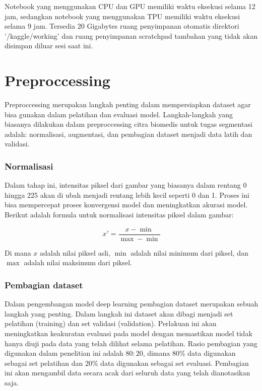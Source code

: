 \noindent Notebook yang menggunakan CPU dan GPU memiliki waktu eksekusi selama 12 jam, sedangkan notebook yang menggunakan TPU memiliki waktu eksekusi selama 9 jam. Tersedia 20 Gigabytes ruang penyimpanan otomatis direktori '/kaggle/working' dan ruang penyimpanan scratchpad tambahan yang tidak akan disimpan diluar sesi saat ini.


\section{Preproccessing}

\noindent Preproccessing merupakan langkah penting dalam mempersiapkan dataset agar bisa gunakan dalam pelatihan dan evaluasi model. Langkah-langkah yang biasanya dilakukan dalam preproccessing citra biomedis untuk tugas segmentasi adalah: normalisasi, augmentasi, dan pembagian dataset menjadi data latih dan validasi.

\subsubsection{Normalisasi}

\noindent Dalam tahap ini, intensitas piksel dari gambar yang biasanya dalam rentang 0 hingga 225 akan di ubah menjadi rentang lebih kecil seperti 0 dan 1. Proses ini bisa mempercepat proses konvergensi model dan meningkatkan akurasi model. Berikut adalah formula untuk normalisasi intensitas piksel dalam gambar:

\begin{equation}
	x' = \frac{x - \min}{\max - \min}
\end{equation}

Di mana \( x \) adalah nilai piksel asli, \( \min \) adalah nilai minimum dari piksel, dan \(\max\) adalah nilai maksimum dari piksel.


\subsubsection{Pembagian dataset}

\noindent Dalam pengembangan model deep learning pembagian dataset merupakan sebuah langkah yang penting. Dalam langkah ini dataset akan dibagi menjadi set pelatihan (training) dan set validasi (validation). Perlakuan ini akan meningkatkan keakuratan evaluasi pada model dengan memastikan model tidak hanya diuji pada data yang telah dilihat selama pelatihan. Rasio pembagian yang digunakan dalam penelitian ini adalah \(80:20\), dimana 80\% data digunakan sebagai set pelatihan dan 20\% data digunakan sebagai set evaluasi. Pembagian ini akan mengambil data secara acak dari seluruh data yang telah dianotasikan saja. 

